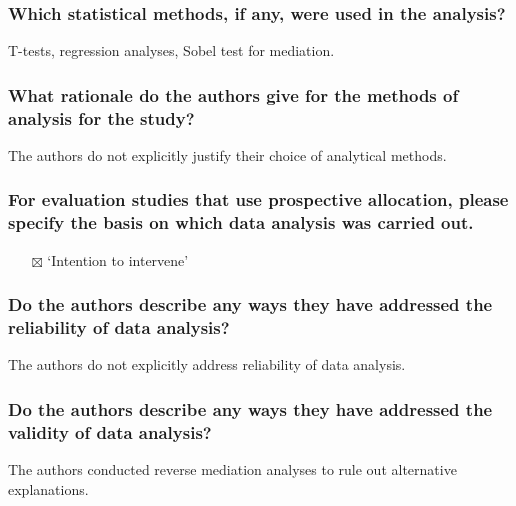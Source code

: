 \documentclass[
  doc, a4paper]{apa7}
\providecommand{\tightlist}{%
  \setlength{\itemsep}{0pt}\setlength{\parskip}{0pt}}
\begin{document}
\subsubsection{Which statistical methods, if any, were used in the analysis?}\label{which-statistical-methods-if-any-were-used-in-the-analysis}

T-tests, regression analyses, Sobel test for mediation.

\subsubsection{What rationale do the authors give for the methods of analysis for the study?}\label{what-rationale-do-the-authors-give-for-the-methods-of-analysis-for-the-study}

The authors do not explicitly justify their choice of analytical methods.

\subsubsection{For evaluation studies that use prospective allocation, please specify the basis on which data analysis was carried out.}\label{for-evaluation-studies-that-use-prospective-allocation-please-specify-the-basis-on-which-data-analysis-was-carried-out.}

\begin{itemize}
\tightlist
\item[$\boxtimes$]
  `Intention to intervene'
\end{itemize}

\subsubsection{Do the authors describe any ways they have addressed the reliability of data analysis?}\label{do-the-authors-describe-any-ways-they-have-addressed-the-reliability-of-data-analysis}

The authors do not explicitly address reliability of data analysis.

\subsubsection{Do the authors describe any ways they have addressed the validity of data analysis?}\label{do-the-authors-describe-any-ways-they-have-addressed-the-validity-of-data-analysis}

The authors conducted reverse mediation analyses to rule out alternative explanations.
\end{document}
